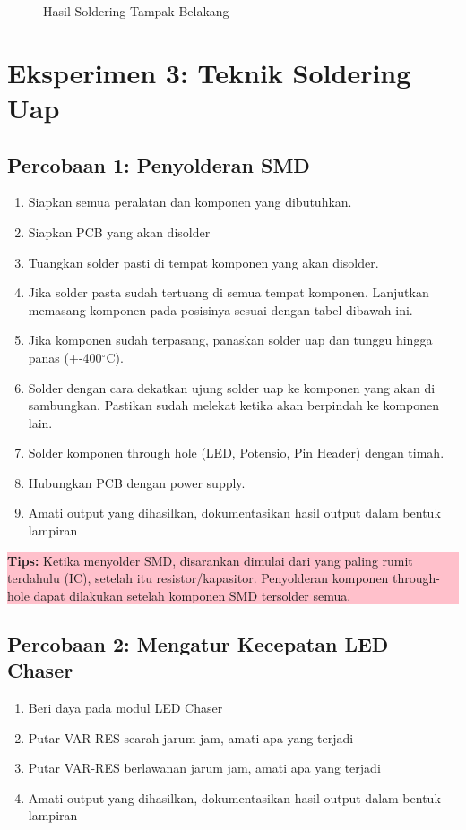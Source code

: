 \begin{enumerate}
\begin{figure}[H]
            \caption{Hasil Soldering Tampak Belakang}
            \label{fig:HasilTampakBelakang}
        \end{figure}
\end{enumerate}

\section{Eksperimen 3: Teknik Soldering Uap}
\subsection{Percobaan 1: Penyolderan SMD}
\begin{enumerate}
    \item Siapkan semua peralatan dan komponen yang dibutuhkan.
    \item Siapkan PCB yang akan disolder
    \item Tuangkan solder pasti di tempat komponen yang akan disolder.
    \item Jika solder pasta sudah tertuang di semua tempat komponen. Lanjutkan memasang komponen pada posisinya sesuai dengan tabel dibawah ini.
    
    \item Jika komponen sudah terpasang, panaskan solder uap dan tunggu hingga panas (+-400$^{\circ}$C).
    \item Solder dengan cara dekatkan ujung solder uap ke komponen yang akan di sambungkan. Pastikan sudah melekat ketika akan berpindah ke komponen lain.
    \item Solder komponen through hole (LED, Potensio, Pin Header) dengan timah.
    \item Hubungkan PCB dengan power supply.
    \item Amati output yang dihasilkan, dokumentasikan hasil output dalam bentuk lampiran
\end{enumerate}


\begin{center}
	\colorbox{pink}{\parbox{0.8\linewidth}{\textbf{Tips:} Ketika menyolder SMD, disarankan dimulai dari yang paling rumit terdahulu (IC),
    setelah itu resistor/kapasitor. Penyolderan komponen through-hole dapat dilakukan
    setelah komponen SMD tersolder semua.}}
\end{center}

\subsection{Percobaan 2: Mengatur Kecepatan LED Chaser}
\begin{enumerate}
    \item Beri daya pada modul LED Chaser
    \item Putar VAR-RES searah jarum jam, amati apa yang terjadi
    \item Putar VAR-RES berlawanan jarum jam, amati apa yang terjadi
    \item Amati output yang dihasilkan, dokumentasikan hasil output dalam bentuk lampiran
\end{enumerate}

